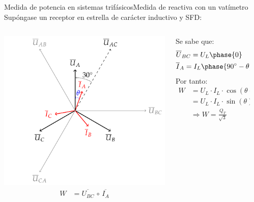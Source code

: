 \documentclass[aspectratio=169, xcolor={usenames,svgnames,dvipsnames}]{beamer}
\begin{document}
\begin{frame}{Medida de potencia en sistemas trifásicos}{Medida de reactiva con un vatímetro}
Supóngase un receptor en estrella de carácter inductivo y SFD:

\begin{columns}
\begin{column}{0.38\columnwidth}
	    \centering
	    \includegraphics[width=0.9\linewidth]{../figs/fasores_potencia3H.pdf}
	    \begin{align*}
	    W&=\overline{U_{BC}}\,\circ\,\overline{I_A}
	\end{align*}
\end{column}
\pause
\begin{column}{0.3\columnwidth}
	Se sabe que:
	\begin{align*}
  &\overline{U}_{BC} = U_L\phase{0}\\
  &\overline{I}_A = I_L\phase{\ang{90} - \theta}
\end{align*}
Por tanto: 
	\begin{align*}
	     W&=U_L\cdot I_L \cdot\cos(\theta-\ang{90})=\\
	     &= U_L\cdot I_L \cdot \sin(\theta)\Rightarrow\\
	     &\Rightarrow\boxed{W = \frac{Q_T}{\sqrt{3}}}
	\end{align*}
\end{column}
\pause
\begin{column}{0.3\linewidth}

\end{column}
\end{columns}
\end{frame}
\end{document}
